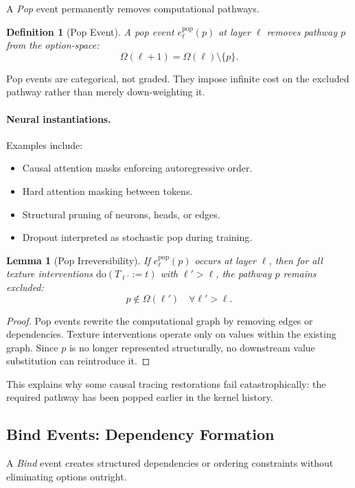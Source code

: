 \documentclass[11pt]{article}
\newtheorem{definition}{Definition}
\newtheorem{lemma}{Lemma}
\theoremstyle{remark}
\newcommand{\Do}{\mathrm{do}}
\begin{document}
A \emph{Pop} event permanently removes computational pathways.

\begin{definition}[Pop Event]
A pop event $e^{\mathrm{pop}}_\ell(p)$ at layer $\ell$ removes pathway
$p$ from the option-space:
\[
\Omega(\ell+1) = \Omega(\ell) \setminus \{p\}.
\]
\end{definition}

Pop events are categorical, not graded. They impose infinite cost on
the excluded pathway rather than merely down-weighting it.

\paragraph{Neural instantiations.}
Examples include:
\begin{itemize}
\item Causal attention masks enforcing autoregressive order.
\item Hard attention masking between tokens.
\item Structural pruning of neurons, heads, or edges.
\item Dropout interpreted as stochastic pop during training.
\end{itemize}

\begin{lemma}[Pop Irreversibility]
If $e^{\mathrm{pop}}_\ell(p)$ occurs at layer $\ell$, then for all
texture interventions $\Do(T_{\ell'} := t)$ with $\ell' > \ell$,
the pathway $p$ remains excluded:
\[
p \notin \Omega(\ell') \quad \forall \ell' > \ell.
\]
\end{lemma}

\begin{proof}
Pop events rewrite the computational graph by removing edges or
dependencies. Texture interventions operate only on values within
the existing graph. Since $p$ is no longer represented structurally,
no downstream value substitution can reintroduce it.
\end{proof}

This explains why some causal tracing restorations fail catastrophically:
the required pathway has been popped earlier in the kernel history.

\subsection{Bind Events: Dependency Formation}

A \emph{Bind} event creates structured dependencies or ordering
constraints without eliminating options outright.
\end{document}
